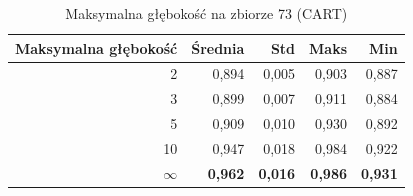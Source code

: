 \begin{table}[htbp]
\centering
\small
\setlength{\tabcolsep}{6pt}
\renewcommand{\arraystretch}{1.2}
\caption{Maksymalna głębokość na zbiorze 73 (CART)}
\label{tab:CART_max_depth_73}
\begin{tabular}{r|r|r|r|r}
\toprule
Maksymalna głębokość & Średnia & Std & Maks & Min \\
\hline
2 & 0,894 & 0,005 & 0,903 & 0,887 \\
3 & 0,899 & 0,007 & 0,911 & 0,884 \\
5 & 0,909 & 0,010 & 0,930 & 0,892 \\
10 & 0,947 & 0,018 & 0,984 & 0,922 \\
\textbf{$\infty$} & \textbf{0,962} & \textbf{0,016} & \textbf{0,986} & \textbf{0,931} \\
\bottomrule
\end{tabular}
\end{table}